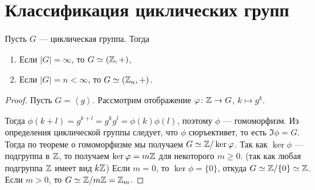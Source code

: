 \section{Классификация циклических групп}

Пусть $G$ --- циклическая группа. Тогда
\begin{enumerate}
    \item Если $|G| = \infty$, то $G \simeq (\mathbb{Z}, +)$,
    \item Если $|G| = n < \infty$, то $G \simeq (\mathbb{Z}_n, +)$.
\end{enumerate}

\begin{proof}
    Пусть $G = \left< g \right>$. Рассмотрим отображение $\varphi \colon \mathbb{Z} \to G$, $k \mapsto g^{k}$.

    Тогда $\phi(k + l) = g^{k + l} = g^{k}g^{l} = \phi(k) \phi(l)$, поэтому $\phi$ --- гомоморфизм.
    Из определения циклической группы следует, что $\phi$ сюръективет, то есть $\Im \phi = G$.
    Тогда по теореме о гомоморфизме мы получаем $G \simeq \mathbb{Z} / \ker \varphi$.
    Так как $\ker \phi$ --- подгруппа в $\mathbb{Z}$, то получаем $\ker \varphi = m\mathbb{Z}$ для некоторого $m \geq 0$. (так как любая подгруппа $\mathbb{Z}$ имеет вид $k \mathbb{Z}$)
    Если $m = 0$, то $\ker \phi = \{0\}$, откуда $G \simeq \mathbb{Z} / \{0\} \simeq \mathbb{Z}$. Если $m > 0$, то $G \simeq \mathbb{Z} / m \mathbb{Z} = \mathbb{Z}_m$.
\end{proof}
